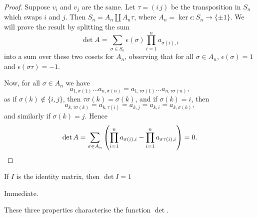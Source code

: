 \begin{proof}
	Suppose $v_i$ and $v_j$ are the same. Let $\tau=(i\,j)$ be the transposition in $S_n$ which swaps $i$ and $j$. Then $S_n = A_n \coprod A_n\tau$, where $A_n = \ker \epsilon : S_n \to \{\pm 1\} $. We will prove the result by splitting the sum %
	\begin{equation*}
		\det A = \sum_{\sigma\in S_n} \epsilon(\sigma) \prod_{i=1}^n a_{\sigma(i),i} 
	\end{equation*}
	into a sum over these two cosets for $A_n$, observing that for all $\sigma \in A_n$, $\epsilon(\sigma)=1$ and $\epsilon(\sigma\tau)=-1$. %

	Now, for all $\sigma \in A_n$ we have
	\begin{equation*}
		a_{1,\sigma(1)} \ldots a_{n,\sigma(n)} = a_{1,\tau\sigma(1)} \ldots a_{n,\tau\sigma(n)}, %
	\end{equation*}
	as if $\sigma(k)\not\in\{i,j\}$, then $\tau\sigma(k) = \sigma(k)$,  and if $\sigma(k) = i$, then %
	\begin{equation*}
		a_{k,\tau\sigma(k)} = a_{k,\tau(i)} = a_{k,j} = a_{k,i} = a_{k,\sigma(k)},
	\end{equation*}
	and similarly  if $\sigma(k)=j$. Hence
	\begin{equation*}
		\det A = \sum_{\sigma\in A_n} \left( \prod_{i=1}^n a_{\sigma(i),i} - \prod_{i=1}^n a_{\sigma\tau(i),i} \right) = 0. \qedhere %
	\end{equation*}
\end{proof}

\begin{proposition}
	If $I$ is the identity matrix, then $\det I=1$ %
\end{proposition}

\begin{proof*}
	Immediate. %
\end{proof*}

\begin{theorem}
	These three properties characterise the function  $\det$. %
\end{theorem}

